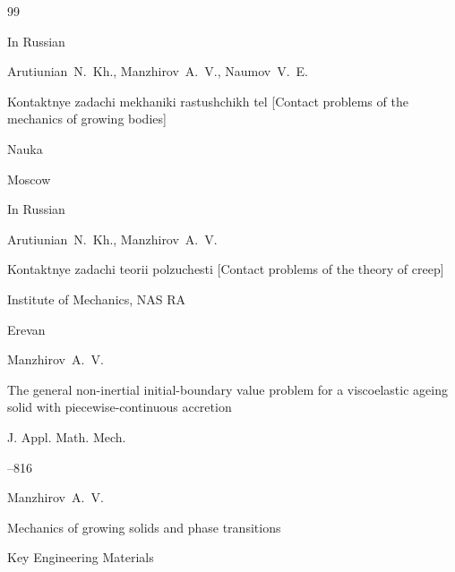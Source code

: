 \begin{thebibliography}{99}

  


\lang In Russian

\by Arutiunian~N.~Kh., Manzhirov~A.~V., Naumov~V.~E.

\book Kontaktnye zadachi mekhaniki rastushchikh tel \rm [Contact problems of the mechanics of growing bodies]


\publ Nauka

\publaddr Moscow







\lang In Russian

\by Arutiunian~N.~Kh., Manzhirov~A.~V.

\book Kontaktnye zadachi teorii polzuchesti \rm [Contact problems of the theory of creep]


\publ Institute of Mechanics, NAS RA

\publaddr Erevan











\by Manzhirov~A.~V.

\paper The general non-inertial initial-boundary value problem for a viscoelastic ageing solid with piecewise-continuous accretion

\jour J. Appl. Math. Mech.




--816





\by Manzhirov~A.~V.

\paper Mechanics of growing solids and phase transitions

\jour Key Engineering Materials



\end{thebibliography}
